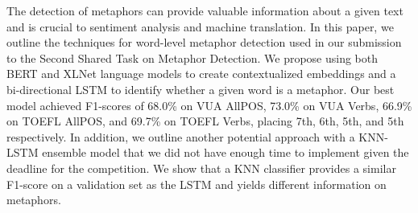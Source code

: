 The detection of metaphors can provide valuable information about a given text and is crucial to sentiment analysis and machine translation. In this paper, we outline the techniques for word-level metaphor detection used in our submission to the Second Shared Task on Metaphor Detection. We propose using both BERT and XLNet language models to create contextualized embeddings and a bi-directional LSTM to identify whether a given word is a metaphor. Our best model achieved F1-scores of 68.0\% on VUA AllPOS, 73.0\% on VUA Verbs, 66.9\% on TOEFL AllPOS, and 69.7\% on TOEFL Verbs, placing 7th, 6th, 5th, and 5th respectively. In addition, we outline another potential approach with a KNN-LSTM ensemble model that we did not have enough time to implement given the deadline for the competition. We show that a KNN classifier provides a similar F1-score on a validation set as the LSTM and yields different information on metaphors.
